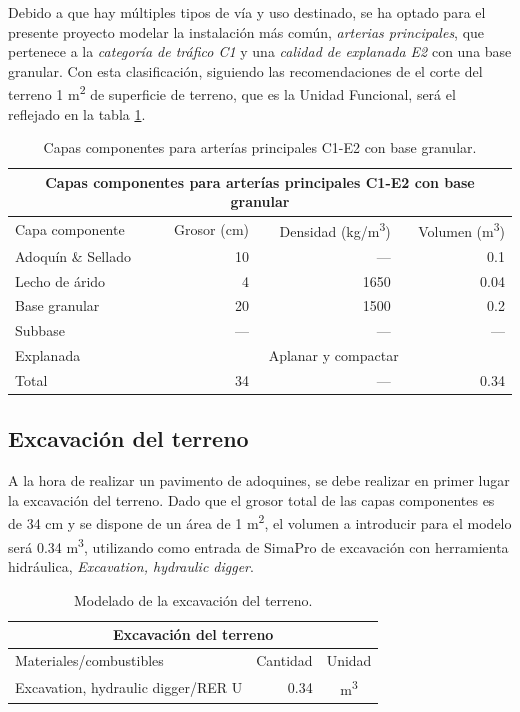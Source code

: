 Debido a que hay múltiples tipos de vía y uso destinado, se ha optado para el presente proyecto modelar la instalación más común, \textit{arterias principales}, que pertenece a la \textit{categoría de tráfico C1} y una \textit{calidad de explanada E2} con una base granular. Con esta clasificación, siguiendo las recomendaciones de \cite{euroadoquinc} el corte del terreno 1 \si{m^2} de superficie de terreno, que es la Unidad Funcional, será el reflejado en la tabla \ref{cortedelterreno}.

\begin{table}[!htb]
\centering
\begin{tabular}{lrrr}
\toprule
\multicolumn{4}{c}{Capas componentes para arterías principales C1-E2 con base granular}\\
\midrule
Capa componente & Grosor (\si{cm}) & Densidad (\si{kg/m^3}) & Volumen (\si{m^3})\\
\midrule
Adoquín \& Sellado & 10 & — & 0.1\\
Lecho de árido & 4 & 1650 & 0.04\\
Base granular & 20 & 1500 & 0.2\\
Subbase & — & — & —\\
Explanada & \multicolumn{3}{c}{Aplanar y compactar}\\
\midrule
Total & 34 & — & 0.34\\
\bottomrule
\end{tabular}
\caption{Capas componentes para arterías principales C1-E2 con base granular.}
\label{cortedelterreno}
\end{table}

\subsection{Excavación del terreno}

A la hora de realizar un pavimento de adoquines, se debe realizar en primer lugar la excavación del terreno. Dado que el grosor total de las capas componentes es de 34 \si{cm} y se dispone de un área de 1 \si{m^2}, el volumen a introducir para el modelo será 0.34 \si{m^3}, utilizando como entrada de SimaPro de excavación con herramienta hidráulica, \textit{Excavation, hydraulic digger}.

\begin{table}[!htb]
\centering
\begin{tabular}{p{8cm}rc}
\toprule
\multicolumn{3}{c}{Excavación del terreno}\\
\midrule
Materiales/combustibles & Cantidad & Unidad\\
\midrule
Excavation, hydraulic digger/RER U & 0.34 & \si{m^3}\\
\bottomrule
\end{tabular}
\caption{Modelado de la excavación del terreno.}
\label{modeladoexcavacion}
\end{table}

